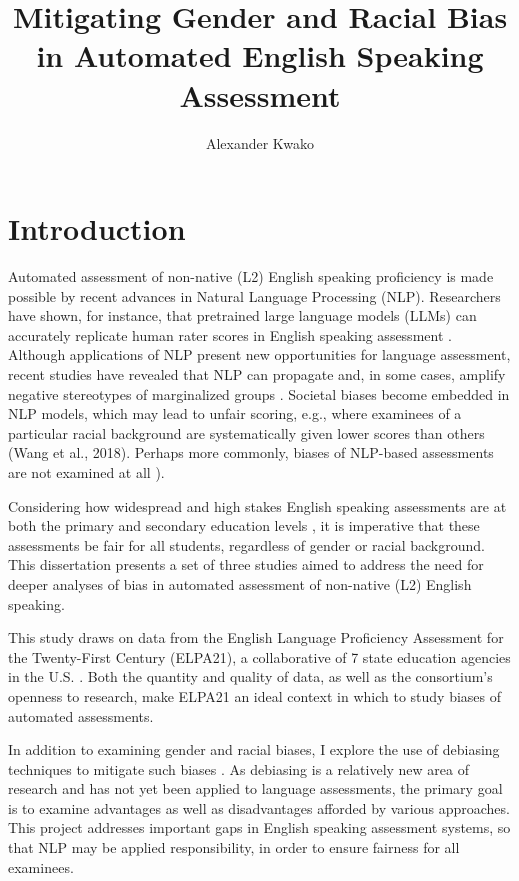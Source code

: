 \documentclass [PhD] {uclathes}
\title          {Mitigating Gender and Racial Bias \\
                in Automated English Speaking Assessment}
\author         {Alexander Kwako}
\begin{document}
\makeintropages

%
%

\chapter{Introduction}

Automated assessment of non-native (L2) English speaking proficiency is made possible by recent advances in Natural Language Processing (NLP). Researchers have shown, for instance, that pretrained large language models (LLMs) can accurately replicate human rater scores in English speaking assessment \citep{wang2021automated}. Although applications of NLP present new opportunities for language assessment, recent studies have revealed that NLP can propagate and, in some cases, amplify negative stereotypes of marginalized groups \citep{blodgett2020}. Societal biases become embedded in NLP models, which may lead to unfair scoring, e.g., where examinees of a particular racial background are systematically given lower scores than others (Wang et al., 2018). Perhaps more commonly, biases of NLP-based assessments are not examined at all \citep[e.g.][]{collier2020test, ormerod2022automated}). 

Considering how widespread and high stakes English speaking assessments are at both the primary and secondary education levels \cite{cimpian2017, ets2005}, it is imperative that these assessments be fair for all students, regardless of gender or racial background. This dissertation presents a set of three studies aimed to address the need for deeper analyses of bias in automated assessment of non-native (L2) English speaking. 

This study draws on data from the English Language Proficiency Assessment for the Twenty-First Century (ELPA21), a collaborative of 7 state education agencies in the U.S. \citep{huang2018english}. Both the quantity and quality of data, as well as the consortium’s openness to research, make ELPA21 an ideal context in which to study biases of automated assessments.

In addition to examining gender and racial biases, I explore the use of debiasing techniques to mitigate such biases \citep{sun2019mitigating}. As debiasing is a relatively new area of research and has not yet been applied to language assessments, the primary goal is to examine advantages as well as disadvantages afforded by various approaches. This project addresses important gaps in English speaking assessment systems, so that NLP may be applied responsibility, in order to ensure fairness for all examinees.
\end{document}

